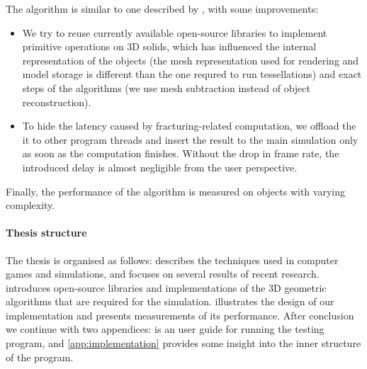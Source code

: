 The algorithm is similar to one described by \citet{nvidia}, with some improvements:
\begin{itemize}
\item We try to reuse currently available open-source libraries to implement primitive operations on 3D solids, which has influenced the internal representation of the objects (\eg the mesh representation used for rendering and model storage is different than the one requred to run tessellations) and exact steps of the algorithms (\eg we use mesh subtraction instead of object reconstruction).
\item To hide the latency caused by fracturing-related computation, we offload the it to other program threads and insert the result to the main simulation only as soon as the computation finishes. Without the drop in frame rate, the introduced delay is almost negligible from the user perspective.
\end{itemize}

Finally, the performance of the algorithm is measured on objects with varying complexity.

\paragraph{Thesis structure}
The thesis is organised as follows:  describes the techniques used in computer games and simulations, and focuses on several results of recent research.  introduces open-source libraries and implementations of the 3D geometric algorithms that are required for the simulation.  illustrates the design of our implementation and presents measurements of its performance. After conclusion we continue with two appendices:  is an user guide for running the testing program, and \cref{app:implementation} provides some insight into the inner structure of the program. 
